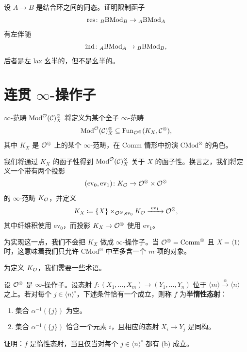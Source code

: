 \begin{exercise}\label{L23-1.4}
设 $A\to B$ 是结合环之间的同态。证明限制函子
\[
\operatorname{res}\colon {}_{B}\mathrm{BMod}_{B}\to{}_{A}\mathrm{BMod}_{A}
\]
有左伴随
\[
\operatorname{ind}\colon {}_{A}\mathrm{BMod}_{A}\to{}_{B}\mathrm{BMod}_{B},
\]
后者是左 lax 幺半的，但不是幺半的。
\end{exercise}

\section{连贯 $\infty$-操作子}

\nitem\label{L23-2.1} $\infty$-范畴 $\operatorname{Mod}^{\mathcal{O}}(\mathcal{C})^{\otimes}_{X}$ 将定义为某个全子 $\infty$-范畴
\[
\operatorname{Mod}^{\mathcal{O}}(\mathcal{C})^{\otimes}_{X}\subseteq\operatorname{Fun}_{\mathcal{O}^{\otimes}}(K_{X},\mathcal{C}^{\otimes}),
\]
其中 $K_{X}$ 是 $\mathcal{O}^{\otimes}$ 上的某个 $\infty$-范畴，在 Comm 情形中扮演 $\mathrm{CMod}^{\otimes}$ 的角色。

我们将通过 $K_{X}$ 的函子性得到 $\operatorname{Mod}^{\mathcal{O}}(\mathcal{C})^{\otimes}_{X}$ 关于 $X$ 的函子性。换言之，我们将定义一个带有两个投影
\[
(\mathrm{ev}_{0},\mathrm{ev}_{1})\colon K_{\mathcal{O}}\to\mathcal{O}^{\otimes}\times\mathcal{O}^{\otimes}
\]
的 $\infty$-范畴 $K_{\mathcal{O}}$，并定义
\[
K_{X}\defeq\{X\}\times_{\OO^{\otimes},\mathrm{ev}_{0}}K_{\OO}\xrightarrow{\ \mathrm{ev}_{1}\ }\OO^{\otimes},
\]
其中纤维积使用 $\mathrm{ev}_{0}$，而投影 $K_{X}\to\mathcal{O}^{\otimes}$ 使用 $\mathrm{ev}_{1}$。

为实现这一点，我们不会把 $K_{X}$ 做成 $\infty$-操作子。当 $\mathcal{O}^{\otimes}=\mathrm{Comm}^{\otimes}$ 且 $X=\langle1\rangle$ 时，这意味着我们只允许 $\mathrm{CMod}^{\otimes}$ 中至多含一个 $m$-项的对象。

\nitem\label{L23-2.2} 为定义 $K_{\mathcal{O}}$，我们需要一些术语。

\begin{definition}\label{L23-2.3}
设 $\mathcal{O}^{\otimes}$ 是 $\infty$-操作子。设态射 $f\colon(X_{1},\dots,X_{m})\to(Y_{1},\dots,Y_{n})$ 位于 $\langle m\rangle\xrightarrow{\alpha}\langle n\rangle$ 之上。若对每个 $j\in\langle n\rangle^{\circ}$，下述条件恰有一个成立，则称 $f$ 为\textbf{半惰性态射}：
\begin{enumerate}[label=(\alph*),leftmargin=2.4em,itemsep=0.1em]
\item 集合 $\alpha^{-1}(\{j\})$ 为空。
\item 集合 $\alpha^{-1}(\{j\})$ 恰含一个元素 $i$，且相应的态射 $X_{i}\to Y_{j}$ 是同构。
\end{enumerate}
\end{definition}

\begin{exercise}\label{L23-2.4}
证明：$f$ 是惰性态射，当且仅当对每个 $j\in\langle n\rangle^{\circ}$ 都有 (b) 成立。
\end{exercise}


